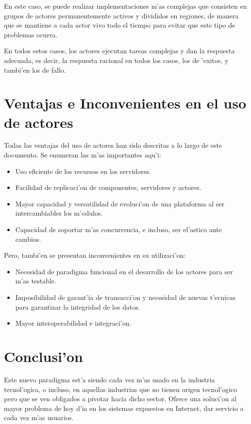 \documentclass[12pt]{article}
\begin{document}
En este caso, se puede realizar implementaciones m'as complejas que consisten en grupos de actores
permanentemente activos y divididos en regiones, de manera que se mantiene a cada actor vivo
todo el tiempo para evitar que este tipo de problemas ocurra.

En todos estos casos, los actores ejecutan tareas complejas y dan la respuesta adecuada, es decir, la
respuesta racional en todos los casos, los de 'exitos, y tambi'en los de fallo.

\section{Ventajas e Inconvenientes en el uso de actores}
\label{sec:ventajas e inconvenientes}
Todas las ventajas del uso de actores han sido descritas a lo largo de este documento. Se enumeran las
m'as importantes aqu'i:

\begin{itemize}
	\item Uso eficiente de los recursos en los servidores.
    \item Facilidad de replicaci'on de componentes, servidores y actores.
    \item Mayor capacidad y versatilidad de evoluci'on de una plataforma al ser intercambiables los m'odulos.
    \item Capacidad de soportar m'as concurrencia, e incluso, ser el'astico ante cambios.
\end{itemize}

Pero, tambi'en se presentan inconvenientes en su utilizaci'on:

\begin{itemize}
    \item Necesidad de paradigma funcional en el desarrollo de los actores para ser m'as testable.
    \item Imposibilidad de garant'ia de transacci'on y necesidad de nuevas t'ecnicas para garantizar la integridad de los datos.
    \item Mayor interoperabilidad e integraci'on.
\end{itemize}

\section{Conclusi'on}
Este nuevo paradigma est'a siendo cada vez m'as usado en la industria tecnol'ogica, o incluso, en aquellas industrias
que no tienen origen tecnol'ogico pero que se ven obligados a pivotar hacia dicho sector. Ofrece una soluci'on al mayor
problema de hoy d'ia en los sistemas expuestos en Internet, dar servicio a cada vez m'as usuarios.
\end{document}
